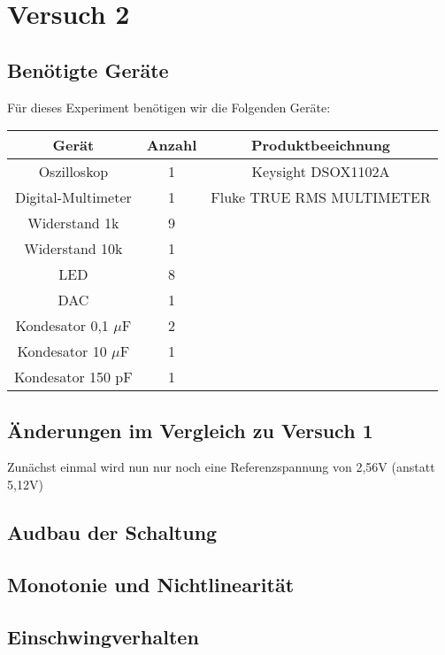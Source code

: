 \chapter{Versuch 2}

\section{Benötigte Geräte}

Für dieses Experiment benötigen wir die Folgenden Geräte:

\begin{tabular}[h]{c|c|c}
    Gerät & Anzahl & Produktbeeichnung\\
    \hline
    Oszilloskop & 1  & Keysight DSOX1102A\\
    \hline
	Digital-Multimeter & 1 & Fluke TRUE RMS MULTIMETER\\
	\hline 
	Widerstand 1k & 9 &  \\
	\hline 
	Widerstand 10k & 1 &  \\
	\hline
	LED & 8 & \\
	\hline
	DAC & 1 &  \\
	\hline
	Kondesator 0,1 $\mu$F & 2 & \\
	\hline
	Kondesator 10 $\mu$F & 1 & \\
	\hline
	Kondesator 150 pF & 1 & 
        \label{tab:Materialliste Versuch 1}
\end{tabular}

\section{Änderungen im Vergleich zu Versuch 1}

Zunächst einmal wird nun nur noch eine Referenzspannung von 2,56V 
(anstatt 5,12V)

\section{Audbau der Schaltung}
\section{Monotonie und Nichtlinearität}
\section{Einschwingverhalten}